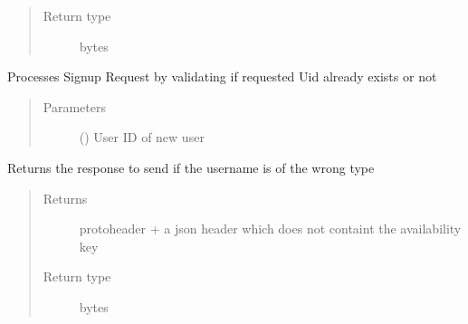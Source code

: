 \documentclass[letterpaper,10pt,english]{sphinxmanual}
\begin{document}
\begin{fulllineitems}
\begin{fulllineitems}
\begin{quote}
\begin{description}
\item[{Return type}] \leavevmode
bytes

\end{description}\end{quote}

\end{fulllineitems}


\begin{fulllineitems}
\label{\detokenize{Message:Message.Message._process_signup_uid}}
Processes Signup Request by validating if requested Uid already exists or not
\begin{quote}\begin{description}
\item[{Parameters}] \leavevmode
{} () \textendash{} User ID of new user

\end{description}\end{quote}

\end{fulllineitems}


\begin{fulllineitems}
\label{\detokenize{Message:Message.Message._invalid_uid_type}}
Returns the response to send if the username is of the wrong type
\begin{quote}\begin{description}
\item[{Returns}] \leavevmode
protoheader + a json header which does not containt the availability key

\item[{Return type}] \leavevmode
bytes

\end{description}\end{quote}

\end{fulllineitems}


\end{fulllineitems}
\end{document}
